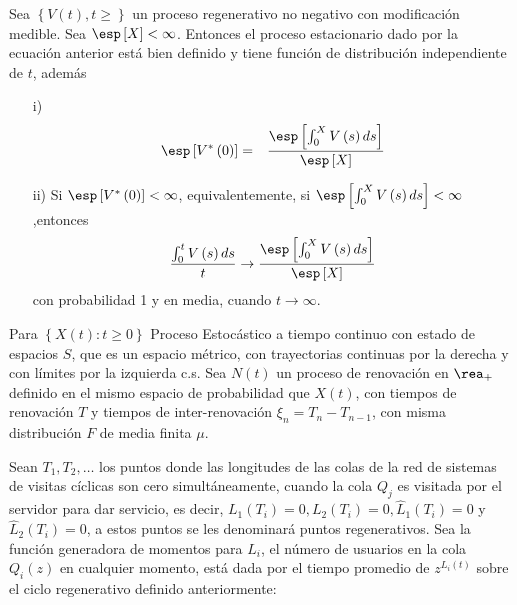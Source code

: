 \begin{Teo}
Sea $\left\{V\left(t\right),t\geq\right\}$ un proceso regenerativo no negativo con modificaci\'on medible. Sea $\esp\left[X\right]<\infty$. Entonces el proceso estacionario dado por la ecuaci\'on anterior est\'a bien definido y tiene funci\'on de distribuci\'on independiente de $t$, adem\'as
\begin{itemize}
\item[i)] \begin{eqnarray*}
\esp\left[V^{*}\left(0\right)\right]&=&\frac{\esp\left[\int_{0}^{X}V\left(s\right)ds\right]}{\esp\left[X\right]}\end{eqnarray*}
\item[ii)] Si $\esp\left[V^{*}\left(0\right)\right]<\infty$, equivalentemente, si $\esp\left[\int_{0}^{X}V\left(s\right)ds\right]<\infty$,entonces
\begin{eqnarray*}
\frac{\int_{0}^{t}V\left(s\right)ds}{t}\rightarrow\frac{\esp\left[\int_{0}^{X}V\left(s\right)ds\right]}{\esp\left[X\right]}
\end{eqnarray*}
con probabilidad 1 y en media, cuando $t\rightarrow\infty$.
\end{itemize}
\end{Teo}

Para $\left\{X\left(t\right):t\geq0\right\}$ Proceso Estoc\'astico a tiempo continuo con estado de espacios $S$, que es un espacio m\'etrico, con trayectorias continuas por la derecha y con l\'imites por la izquierda c.s. Sea $N\left(t\right)$ un proceso de renovaci\'on en $\rea_{+}$ definido en el mismo espacio de probabilidad que $X\left(t\right)$, con tiempos de renovaci\'on $T$ y tiempos de inter-renovaci\'on $\xi_{n}=T_{n}-T_{n-1}$, con misma distribuci\'on $F$ de media finita $\mu$.




Sean $T_{1},T_{2},\ldots$ los puntos donde las longitudes de las colas de la red de sistemas de visitas c\'iclicas son cero simult\'aneamente, cuando la cola $Q_{j}$ es visitada por el servidor para dar servicio, es decir, $L_{1}\left(T_{i}\right)=0,L_{2}\left(T_{i}\right)=0,\hat{L}_{1}\left(T_{i}\right)=0$ y $\hat{L}_{2}\left(T_{i}\right)=0$, a estos puntos se les denominar\'a puntos regenerativos. Sea la funci\'on generadora de momentos para $L_{i}$, el n\'umero de usuarios en la cola $Q_{i}\left(z\right)$ en cualquier momento, est\'a dada por el tiempo promedio de $z^{L_{i}\left(t\right)}$ sobre el ciclo regenerativo definido anteriormente:

